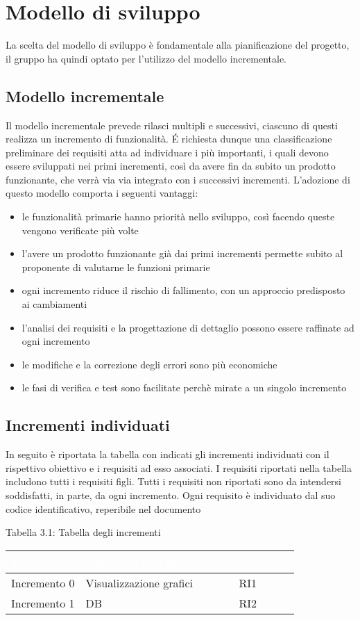 \section{Modello di sviluppo}
La scelta del modello di sviluppo è fondamentale alla pianificazione del progetto, il gruppo ha quindi optato per l'utilizzo del modello incrementale.
\subsection{Modello incrementale}
Il modello incrementale prevede rilasci multipli e successivi, ciascuno di questi realizza un incremento di funzionalità.
É richiesta dunque una classificazione preliminare dei requisiti atta ad individuare i più importanti, i quali devono essere sviluppati nei primi incrementi, così da avere fin da subito un prodotto funzionante, che verrà via via integrato con i successivi incrementi.
L'adozione di questo modello comporta i seguenti vantaggi:
\begin{itemize}
\item le funzionalità primarie hanno priorità nello sviluppo, così facendo queste vengono verificate più volte
\item l'avere un prodotto funzionante già dai primi incrementi permette subito al proponente di valutarne le funzioni primarie
\item ogni incremento riduce il rischio di fallimento, con un approccio predisposto ai cambiamenti
\item l'analisi dei requisiti e la progettazione di dettaglio possono essere raffinate ad ogni incremento
\item le modifiche e la correzione degli errori sono più economiche
\item le fasi di verifica e test sono facilitate perchè mirate a un singolo incremento
\end{itemize}
\subsection{Incrementi individuati}
In seguito è riportata la tabella con indicati gli incrementi individuati con il rispettivo obiettivo e i requisiti ad esso associati.
I requisiti riportati nella tabella includono tutti i requisiti figli. Tutti i requisiti non riportati sono da intendersi soddisfatti, in parte, da ogni incremento.
Ogni requisito è individuato dal suo codice identificativo, reperibile nel documento \AdR
\begin{center}
Tabella 3.1: Tabella degli incrementi
\end{center}
\begin{longtable}{C{3cm} C{5cm} C{3cm}}
\textcolor{white}{\textbf{Incremento}} & 
\textcolor{white}{\textbf{Obiettivo dell'incremento}} & 
\textcolor{white}{\textbf{Requisiti}}\\
\endhead

Incremento 0 & Visualizzazione grafici & RI1\\
Incremento 1 & DB & RI2\\
\end{longtable}

